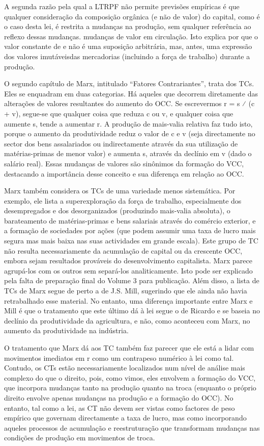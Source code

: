  \par 
A segunda razão pela qual a LTRPF não permite previsões empíricas é que qualquer consideração da composição orgânica (e não de valor) do capital, como é o caso desta lei, é restrita a mudanças na produção, sem qualquer referência ao reflexo dessas mudanças. mudanças de valor em circulação. Isto explica por que o valor constante de e não é uma suposição arbitrária, mas, antes, uma expressão dos valores imutáveis ​​das mercadorias (incluindo a força de trabalho) durante a produção.
 \par 
O segundo capítulo de Marx, intitulado “Fatores Contrariantes”, trata dos TCs. Eles se enquadram em duas categorias. Há aqueles que decorrem diretamente das alterações de valores resultantes do aumento do OCC. Se escrevermos r = s ⁄ (c + v), segue-se que qualquer coisa que reduza c ou v, e qualquer coisa que aumente s, tende a aumentar r. A produção de mais-valia relativa faz tudo isto, porque o aumento da produtividade reduz o valor de c e v (seja directamente no sector dos bens assalariados ou indirectamente através da sua utilização de matérias-primas de menor valor) e aumenta s, através da declínio em v (dado o salário real). Essas mudanças de valores são sinônimos da formação do VCC, destacando a importância desse conceito e sua diferença em relação ao OCC.
 \par 
Marx também considera os TCs de uma variedade menos sistemática. Por exemplo, ele lista a superexploração da força de trabalho, especialmente dos desempregados e dos desorganizados (produzindo mais-valia absoluta), o barateamento de matérias-primas e bens salariais através do comércio exterior, e a formação de sociedades por ações (que podem assumir uma taxa de lucro mais segura mas mais baixa nas suas actividades em grande escala). Este grupo de TC não resulta necessariamente da acumulação de capital ou da crescente OCC, embora sejam resultados prováveis ​​do desenvolvimento capitalista. Marx parece agrupá-los com os outros sem separá-los analiticamente. Isto pode ser explicado pela falta de preparação final do Volume {\color{blue}3} para publicação. Além disso, a lista de TCs de Marx segue de perto a de J.S. Mill, sugerindo que ele ainda não havia retrabalhado esse material. No entanto, uma diferença importante entre Marx e Mill é que o tratamento que este último dá à lei segue o de Ricardo e se baseia no declínio da produtividade da agricultura, e não, como aconteceu com Marx, no aumento da produtividade na indústria.
 \par 
O tratamento que Marx dá aos TC também faz parecer que ele está a lidar com movimentos imediatos em r como um contrapeso numérico à lei como tal. Contudo, os CTs estão necessariamente localizados num nível de análise mais complexo do que o direito, pois, como vimos, eles envolvem a formação do VCC, que incorpora mudanças tanto na produção quanto na troca (enquanto o próprio direito envolve apenas mudanças na produção e a formação do OCC). No entanto, tal como a lei, as CT não devem ser vistas como factores de peso empírico que governam directamente a taxa de lucro, mas como incorporando aqueles processos de acumulação e reestruturação que transformam mudanças nas condições de produção em movimentos de troca.
 \par 
